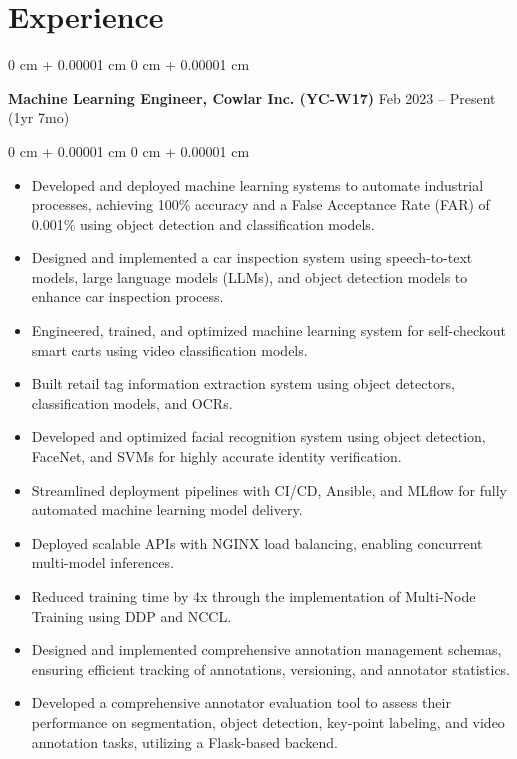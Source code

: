 \documentclass[10pt, letterpaper]{article}
\newenvironment{highlights}{
    \begin{itemize}[
        topsep=0.10 cm,
        parsep=0.10 cm,
        partopsep=0pt,
        itemsep=0pt,
        leftmargin=0 cm + 10pt
    ]
}{
    \end{itemize}
} %
\newenvironment{onecolentry}{
    \begin{adjustwidth}{
        0 cm + 0.00001 cm
    }{
        0 cm + 0.00001 cm
    }
}{
    \end{adjustwidth}
} %
\newenvironment{twocolentry}[2][]{
    \onecolentry
    \def\secondColumn{#2}
    \setcolumnwidth{\fill, 4.5 cm}
    \begin{paracol}{2}
}{
    \switchcolumn \raggedleft \secondColumn
    \end{paracol}
    \endonecolentry
} %
\begin{document}
   
    
    \section{Experience}



        
        \begin{twocolentry}{
            Feb 2023 – Present \\ 
            (1yr 7mo)
        }
            \textbf{Machine Learning Engineer, Cowlar Inc. (YC-W17) } \end{twocolentry}

        \vspace{0.30 cm}
        \begin{onecolentry}
            \begin{highlights}
            \item Developed and deployed machine learning systems to automate industrial processes, achieving 100\% accuracy and a False Acceptance Rate (FAR) of 0.001\% using object detection and classification models.
            \item Designed and implemented a car inspection system using speech-to-text models, large language models (LLMs), and object detection models to enhance car inspection process.
            \item Engineered, trained, and optimized machine learning system for self-checkout smart carts using video classification models.
            \item Built retail tag information extraction system using object detectors, classification models, and OCRs.
            \item Developed and optimized facial recognition system using object detection, FaceNet, and SVMs for highly accurate identity verification.
            \item Streamlined deployment pipelines with CI/CD, Ansible, and MLflow for fully automated machine learning model delivery.
            \item Deployed scalable APIs with NGINX load balancing, enabling concurrent multi-model inferences.
            \item Reduced training time by 4x through the implementation of Multi-Node Training using DDP and NCCL.
            \item Designed and implemented comprehensive annotation management schemas, ensuring efficient tracking of annotations, versioning, and annotator statistics.
            \item Developed a comprehensive annotator evaluation tool to assess their performance on segmentation, object detection, key-point labeling, and video annotation tasks, utilizing a Flask-based backend.
            \end{highlights}
        \end{onecolentry}
\end{document}
